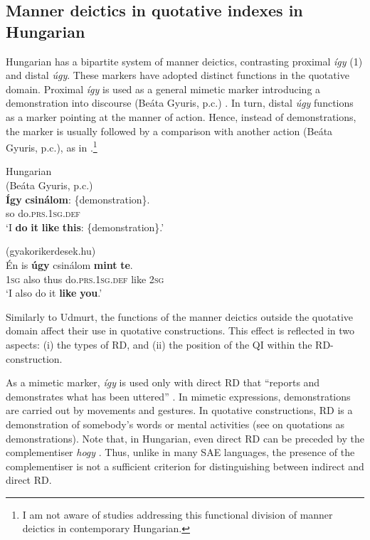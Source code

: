 \documentclass[output=paper,colorlinks,citecolor=brown]{langscibook}
\begin{document}
\subsection{ Manner deictics in quotative indexes in Hungarian}\label{sec:teptiuk:4.3}

Hungarian has a bipartite system of manner deictics, contrasting proximal \textit{így} (1) and distal \textit{úgy}. These markers have adopted distinct functions in the quotative domain. Proximal \textit{így} is used as a general mimetic marker introducing a demonstration into discourse (Beáta Gyuris, p.c.) . In turn, distal \textit{úgy} functions as a marker pointing at the manner of action. Hence, instead of demonstrations, the marker is usually followed by a comparison with another action (Beáta Gyuris, p.c.), as in .\footnote{I am not aware of studies addressing this functional division of manner deictics in contemporary Hungarian.}

\ea\label{ex:teptiuk:21} Hungarian\\
\ea\label{ex:teptiuk:21a} (Beáta Gyuris, p.c.)\\
\gll \textbf{Így} \textbf{csinálom}: \{demonstration\}.\\
 so do\textsc{.prs.1sg.def}\\
\glt ‘I \textbf{do} \textbf{it} \textbf{like} \textbf{this}: \{demonstration\}.’

\ex\label{ex:teptiuk:21b} (gyakorikerdesek.hu)\\
\gll Én is \textbf{úgy} csinálom \textbf{mint} \textbf{te}.\\
 1\textsc{sg} also thus do.\textsc{prs.1sg.def} like 2\textsc{sg}\\
\glt ‘I also do it \textbf{like} \textbf{you}.’
\z
\z

Similarly to Udmurt, the functions of the manner deictics outside the quotative domain affect their use in quotative constructions. This effect is reflected in two aspects: (i) the types of RD, and (ii) the position of the QI within the RD-construction.

As a mimetic marker, \textit{így} is used only with direct RD that “reports and demonstrates what has been uttered” \citep[338]{Dömötör2001}. In mimetic expressions, demonstrations are carried out by movements and gestures. In quotative constructions, RD is a demonstration of somebody’s words  or mental activities  (see \citealt{ClarkGerrig1990} on quotations as demonstrations). Note that, in Hungarian, even direct RD can be preceded by the complementiser \textit{hogy} . Thus, unlike in many SAE languages, the presence of the complementiser  is not a sufficient criterion for distinguishing between indirect and direct RD.
\end{document}
